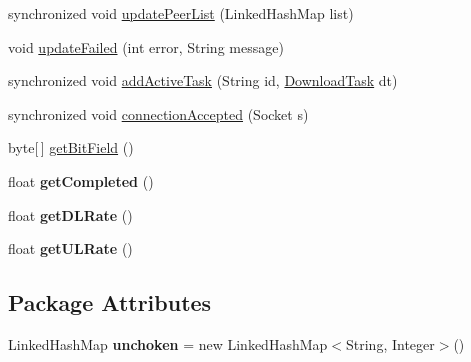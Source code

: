 \begin{DoxyCompactItemize}
\item 
synchronized void \hyperlink{classj_bittorrent_a_p_i_1_1_download_manager_a04d9d710297689ef852f92f8b1407e33}{updatePeerList} (LinkedHashMap list)
\item 
void \hyperlink{classj_bittorrent_a_p_i_1_1_download_manager_a2c67828f0474dc0a8a104cb70ad676fb}{updateFailed} (int error, String message)
\item 
synchronized void \hyperlink{classj_bittorrent_a_p_i_1_1_download_manager_a753e445be7616198024e9e7eefdede79}{addActiveTask} (String id, \hyperlink{classj_bittorrent_a_p_i_1_1_download_task}{DownloadTask} dt)
\item 
synchronized void \hyperlink{classj_bittorrent_a_p_i_1_1_download_manager_a5e63578834159ff3471d3f6cfe6bfc5d}{connectionAccepted} (Socket s)
\item 
byte\mbox{[}$\,$\mbox{]} \hyperlink{classj_bittorrent_a_p_i_1_1_download_manager_a04fb67e897432a490950863e2d9c7d32}{getBitField} ()
\item 
\hypertarget{classj_bittorrent_a_p_i_1_1_download_manager_a8cc9b50440ef11e972bb665aa8076642}{
float {\bfseries getCompleted} ()}
\label{classj_bittorrent_a_p_i_1_1_download_manager_a8cc9b50440ef11e972bb665aa8076642}

\item 
\hypertarget{classj_bittorrent_a_p_i_1_1_download_manager_a384cfe67c4829d53c35b6ac8cfa3cbd0}{
float {\bfseries getDLRate} ()}
\label{classj_bittorrent_a_p_i_1_1_download_manager_a384cfe67c4829d53c35b6ac8cfa3cbd0}

\item 
\hypertarget{classj_bittorrent_a_p_i_1_1_download_manager_a55980980c2e924f37d3e357d327bef1b}{
float {\bfseries getULRate} ()}
\label{classj_bittorrent_a_p_i_1_1_download_manager_a55980980c2e924f37d3e357d327bef1b}

\end{DoxyCompactItemize}
\subsection*{Package Attributes}
\begin{DoxyCompactItemize}
\item 
\hypertarget{classj_bittorrent_a_p_i_1_1_download_manager_a4c56552ac54e21a08dfd058714adf498}{
LinkedHashMap {\bfseries unchoken} = new LinkedHashMap$<$String, Integer$>$()}
\label{classj_bittorrent_a_p_i_1_1_download_manager_a4c56552ac54e21a08dfd058714adf498}

\end{DoxyCompactItemize}


